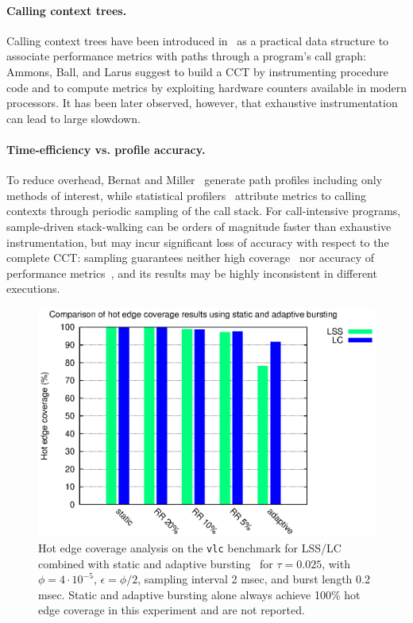 \documentclass{sigplanconf}
\begin{document}
\paragraph{Calling context trees.} Calling context trees have been introduced in~\cite{ABL97} as a practical data structure to associate performance metrics with paths through a program's call graph: Ammons, Ball, and Larus suggest to build a CCT by instrumenting procedure code and to compute metrics by exploiting hardware counters available in modern processors. It has been later observed, however, that exhaustive instrumentation can lead to large slowdown. 

\paragraph{Time-efficiency vs. profile accuracy.} To reduce overhead, Bernat and Miller~\cite{BM04} generate path profiles including only methods of interest, while statistical profilers~\cite{AS00, FMF05, HG93, W00} attribute metrics to calling contexts through periodic sampling of the call stack. For call-intensive programs, sample-driven stack-walking can be orders of magnitude faster than exhaustive instrumentation, but may incur significant loss of accuracy with respect to the complete CCT: sampling guarantees neither high coverage~\cite{BM07} nor accuracy of performance metrics~\cite{ZSCC06}, and its results may be highly inconsistent in different executions. 

\begin{figure}[t]
\center\includegraphics[width=\columnwidth]{charts/sampling-accuracy.eps}
\caption{Hot edge coverage analysis on the {\tt vlc} benchmark for LSS/LC combined with static and adaptive bursting~\cite{ZSCC06} for $\tau=0.025$, with $\phi=4\cdot 10^{-5}$, $\epsilon=\phi/2$, sampling interval 2 msec, and burst length 0.2 msec. Static and adaptive bursting alone always achieve 100\% hot edge coverage in this experiment and are not reported.}
\label{fig:sampling-accuracy}
\end{figure}
\end{document}
